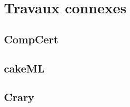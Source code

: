 %
\chapter{Travaux connexes}
\label{sec::chapitre5}

\section{CompCert}

\section{cakeML}

\section{Crary}

